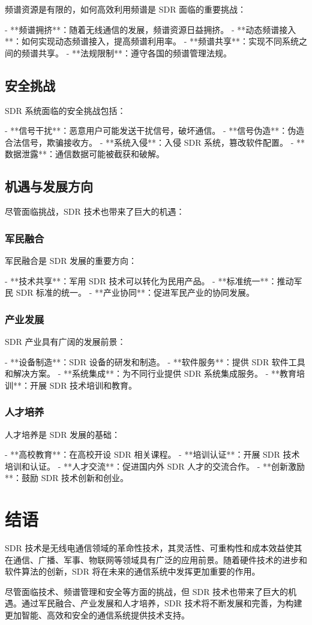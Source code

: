 \documentclass[UTF8]{ctexbook}
\begin{document}
频谱资源是有限的，如何高效利用频谱是 SDR 面临的重要挑战：

- **频谱拥挤**：随着无线通信的发展，频谱资源日益拥挤。
- **动态频谱接入**：如何实现动态频谱接入，提高频谱利用率。
- **频谱共享**：实现不同系统之间的频谱共享。
- **法规限制**：遵守各国的频谱管理法规。

\subsection{安全挑战}

SDR 系统面临的安全挑战包括：

- **信号干扰**：恶意用户可能发送干扰信号，破坏通信。
- **信号伪造**：伪造合法信号，欺骗接收方。
- **系统入侵**：入侵 SDR 系统，篡改软件配置。
- **数据泄露**：通信数据可能被截获和破解。

\subsection{机遇与发展方向}

尽管面临挑战，SDR 技术也带来了巨大的机遇：

\subsubsection{军民融合}

军民融合是 SDR 发展的重要方向：

- **技术共享**：军用 SDR 技术可以转化为民用产品。
- **标准统一**：推动军民 SDR 标准的统一。
- **产业协同**：促进军民产业的协同发展。

\subsubsection{产业发展}

SDR 产业具有广阔的发展前景：

- **设备制造**：SDR 设备的研发和制造。
- **软件服务**：提供 SDR 软件工具和解决方案。
- **系统集成**：为不同行业提供 SDR 系统集成服务。
- **教育培训**：开展 SDR 技术培训和教育。

\subsubsection{人才培养}

人才培养是 SDR 发展的基础：

- **高校教育**：在高校开设 SDR 相关课程。
- **培训认证**：开展 SDR 技术培训和认证。
- **人才交流**：促进国内外 SDR 人才的交流合作。
- **创新激励**：鼓励 SDR 技术创新和创业。

\section{结语}

SDR 技术是无线电通信领域的革命性技术，其灵活性、可重构性和成本效益使其在通信、广播、军事、物联网等领域具有广泛的应用前景。随着硬件技术的进步和软件算法的创新，SDR 将在未来的通信系统中发挥更加重要的作用。

尽管面临技术、频谱管理和安全等方面的挑战，但 SDR 技术也带来了巨大的机遇。通过军民融合、产业发展和人才培养，SDR 技术将不断发展和完善，为构建更加智能、高效和安全的通信系统提供技术支持。
\end{document}
